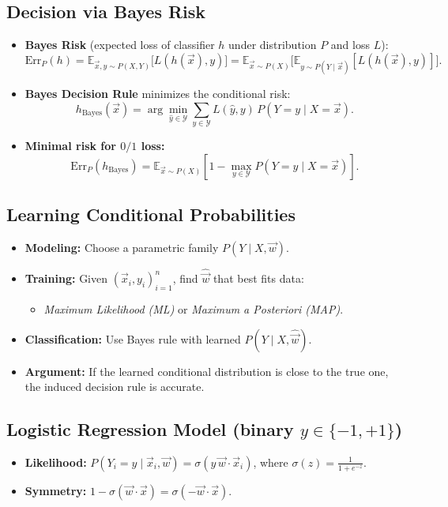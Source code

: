 \subsection{Decision via Bayes Risk}
\begin{itemize}
    \item \textbf{Bayes Risk} (expected loss of classifier $h$ under distribution $P$ and loss $L$):
    \[
      \mathrm{Err}_{P}(h)=\mathbb{E}_{\vec{x},y\sim P(X,Y)}\!\!\big[L(h(\vec{x}),y)\big]
      =\mathbb{E}_{\vec{x}\sim P(X)}\big[\mathbb{E}_{y\sim P(Y\mid \vec{x})}[L(h(\vec{x}),y)]\big].
    \]
    \item \textbf{Bayes Decision Rule} minimizes the conditional risk:
    \[
      h_{\text{Bayes}}(\vec{x})=\arg\min_{\hat{y}\in\mathcal{Y}}
      \sum_{y\in\mathcal{Y}} L(\hat{y},y)\,P(Y=y\mid X=\vec{x}).
    \]
    \item \textbf{Minimal risk for $0/1$ loss:}
    \[
      \mathrm{Err}_{P}(h_{\text{Bayes}})
      =\mathbb{E}_{\vec{x}\sim P(X)}\!\left[1-\max_{y\in\mathcal{Y}} P(Y=y\mid X=\vec{x})\right].
    \]
\end{itemize}

\subsection{Learning Conditional Probabilities}
\begin{itemize}
    \item \textbf{Modeling:} Choose a parametric family $P(Y\mid X,\vec{w})$.
    \item \textbf{Training:} Given $(\vec{x}_i,y_i)_{i=1}^n$, find $\hat{\vec{w}}$ that best fits data:
    \begin{itemize}
        \item \textit{Maximum Likelihood (ML)} or \textit{Maximum a Posteriori (MAP)}.
    \end{itemize}
    \item \textbf{Classification:} Use Bayes rule with learned $P(Y\mid X,\hat{\vec{w}})$.
    \item \textbf{Argument:} If the learned conditional distribution is close to the true one, the induced decision rule is accurate.
\end{itemize}

\subsection{Logistic Regression Model (binary $y\in\{-1,+1\}$)}
\begin{itemize}
    \item \textbf{Likelihood:} $P(Y_i=y\mid \vec{x}_i,\vec{w})=\sigma(y\,\vec{w}\!\cdot\!\vec{x}_i)$,
    \qquad where $\displaystyle \sigma(z)=\frac{1}{1+e^{-z}}$.
    \item \textbf{Symmetry:} $1-\sigma(\vec{w}\!\cdot\!\vec{x})=\sigma(-\vec{w}\!\cdot\!\vec{x})$.
\end{itemize}

